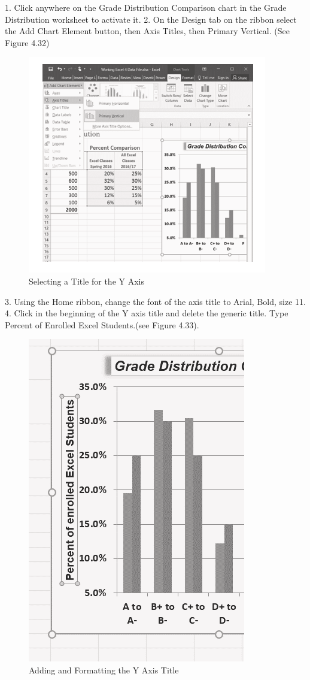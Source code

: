 1. Click anywhere on the Grade Distribution Comparison chart in the Grade Distribution
worksheet to activate it.
2. On the Design tab on the ribbon select the Add Chart Element button, then Axis Titles, then
Primary Vertical. (See Figure 4.32)


\begin{figure}[H]
	\centering
	\includegraphics[width=\maxwidth{.95\linewidth}]{gfx/ch04_fig33}
	\caption{Selecting a Title for the Y Axis}
	\label{04:fig33}
\end{figure}

3. Using the Home ribbon, change the font of the axis title to Arial, Bold, size 11.
4. Click in the beginning of the Y axis title and delete the generic title. Type Percent of Enrolled
Excel Students.(see Figure 4.33).


\begin{figure}[H]
	\centering
	\includegraphics[width=\maxwidth{.95\linewidth}]{gfx/ch04_fig34}
	\caption{Adding and Formatting the Y Axis Title}
	\label{04:fig34}
\end{figure}


